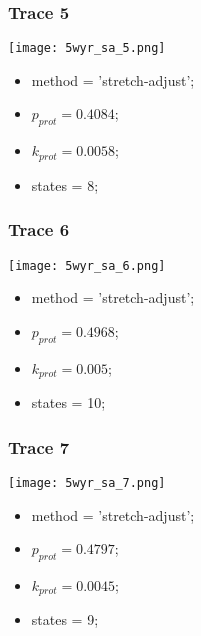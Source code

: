 \subsubsection{Trace 5}
\begin{minipage}[c]{0.7\textwidth}
    \texttt{[image: 5wyr\_sa\_5.png]}
\end{minipage}
\hfill
\begin{minipage}[c]{0.45\textwidth}
    \begin{itemize}
        \item method = 'stretch-adjust';
        \item $p_{prot}=0.4084$;
        \item $k_{prot}=0.0058$;
        \item states = 8;
    \end{itemize}
\end{minipage}

\subsubsection{Trace 6}
\begin{minipage}[c]{0.7\textwidth}
    \texttt{[image: 5wyr\_sa\_6.png]}
\end{minipage}
\hfill
\begin{minipage}[c]{0.45\textwidth}
    \begin{itemize}
        \item method = 'stretch-adjust';
        \item $p_{prot}=0.4968$;
        \item $k_{prot}=0.005$;
        \item states = 10;
    \end{itemize}
\end{minipage}

\subsubsection{Trace 7}
\begin{minipage}[c]{0.7\textwidth}
    \texttt{[image: 5wyr\_sa\_7.png]}
\end{minipage}
\hfill
\begin{minipage}[c]{0.45\textwidth}
    \begin{itemize}
        \item method = 'stretch-adjust';
        \item $p_{prot}=0.4797$;
        \item $k_{prot}=0.0045$;
        \item states = 9;
    \end{itemize}
\end{minipage}

